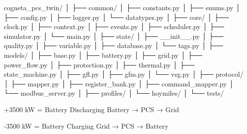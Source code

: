 cogneta_pcs_twin/
│
├── common/
│   ├── constants.py
│   ├── enums.py
│   ├── config.py
│   ├── logger.py
│   └── datatypes.py
│
├── core/
│   ├── clock.py
│   ├── context.py
│   ├── events.py
│   ├── scheduler.py
│   ├── simulator.py
│   └── main.py
│
├── state/
│   ├── __init__.py
│   ├── quality.py
│   ├── variable.py
│   ├── database.py
│   └── tags.py
│
├── models/
│   ├── base.py
│   ├── battery.py
│   ├── grid.py
│   ├── power_flow.py
│   ├── protection.py
│   ├── thermal.py
│   ├── state_machine.py
│   ├── gfl.py
│   ├── gfm.py
│   └── vsg.py
│
├── protocol/
│   ├── mapper.py
│   ├── register_bank.py
│   ├── command_mapper.py
│   └── modbus_server.py
│
├── profiles/
│   └── hoymiles/
│
└── tests/


+3500 kW  = Battery Discharging
            Battery → PCS → Grid

-3500 kW  = Battery Charging
            Grid → PCS → Battery